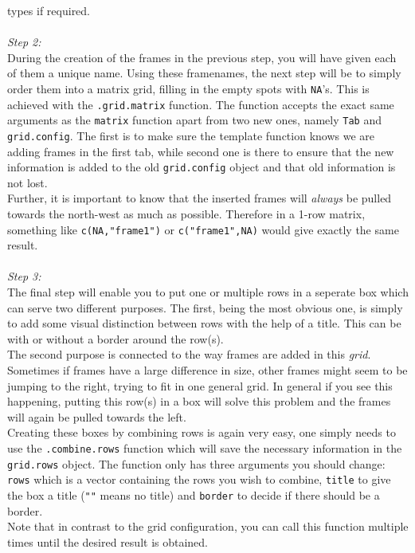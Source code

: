 \documentclass[a4paper]{article}\usepackage[]{graphicx}\usepackage[]{color}
\begin{document}
types if required.
\\ \\
{\it Step 2:}\\
During the creation of the frames in the previous step, you will have given each
of them a unique name. Using these framenames, the next step will be to simply
order them into a matrix grid, filling in the empty spots with \verb|NA|'s.
This is achieved with the \verb|.grid.matrix| function. The function accepts
the exact same arguments as the \verb|matrix| function apart from two new ones,
namely \verb|Tab| and \verb|grid.config|. The first is to make sure the
template function knows we are adding frames in the first tab, while second one
is there to ensure that the new information is added to the old
\verb|grid.config| object and that old information is not lost.\\
Further, it is important to know that the inserted frames will {\it always} be
pulled towards the north-west as much as possible. Therefore in a 1-row
matrix, something like \verb|c(NA,"frame1")| or \verb|c("frame1",NA)| would give
exactly the same result.
\\ \\
{\it Step 3:}\\
The final step will enable you to put one or multiple rows in a seperate box
which can serve two different purposes. The first, being the most obvious one, is
simply to add some visual distinction between rows with the help of a title.
This can be with or without a border around the row(s).\\
The second purpose is connected to the way frames are added in this {\it grid}.
Sometimes if frames have a large difference in size, other frames might seem to
be jumping to the right, trying to fit in one general grid. In general if you
see this happening, putting this row(s) in a box will solve this problem and the
frames will again be pulled towards the left.\\
Creating these boxes by combining rows is again very easy, one simply needs to
use the \verb|.combine.rows| function which will save the necessary information
in the \verb|grid.rows| object. The function only has three arguments you should
change: \verb|rows| which is a vector containing the rows you wish to
combine, \verb|title| to give the box a title (\verb|""| means no title) and
\verb|border| to decide if there should be a border.\\
Note that in contrast to the grid configuration, you can call this function
multiple times until the desired result is obtained.
\end{document}
